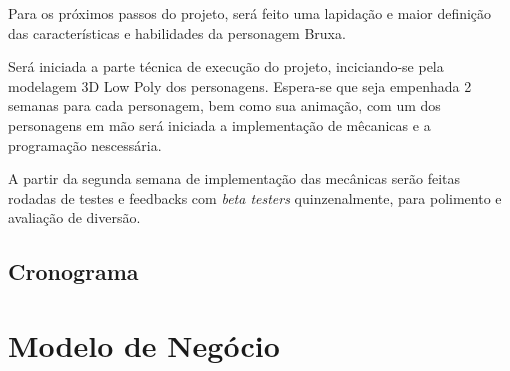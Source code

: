 Para os próximos passos do projeto, será feito uma lapidação e maior definição das características e habilidades da personagem Bruxa.

Será iniciada a parte técnica de execução do projeto, inciciando-se pela modelagem 3D Low Poly dos personagens. Espera-se que seja empenhada 2 semanas para cada personagem, bem como sua animação, com um dos personagens em mão será iniciada a implementação de mêcanicas e a programação nescessária.

A partir da segunda semana de implementação das mecânicas serão feitas rodadas de testes e feedbacks com \textit{beta testers} quinzenalmente, para polimento e avaliação de diversão.


\section{Cronograma}


\chapter{Modelo de Negócio}


